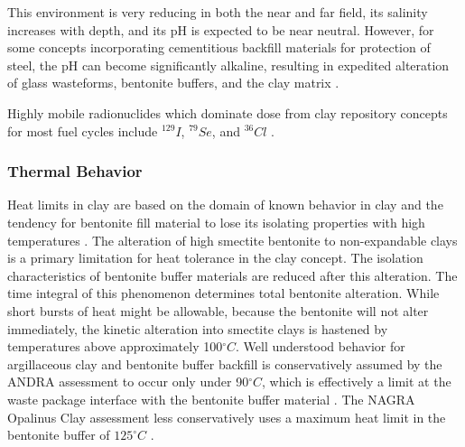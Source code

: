 This environment is very reducing in both the near and far field, its salinity 
increases with depth, and its pH is expected to be near neutral. However, for 
some concepts incorporating cementitious backfill materials for protection 
of steel, the pH can become significantly alkaline, resulting in 
expedited alteration of glass wasteforms, bentonite buffers, and the clay 
matrix \cite{andra_argile:_2005}.


Highly mobile radionuclides which dominate dose from clay repository concepts 
for most fuel cycles include $^{129}I$, $^{79}Se$, and $^{36}Cl$ 
\cite{swift_applying_2010}. 

\subsubsection{Thermal Behavior}
\label{subsec:claythermal}


Heat limits in clay are based on the domain of known behavior in clay and the 
tendency for bentonite fill material to lose its isolating properties with high 
temperatures \cite{andra_argile:_2005, pusch_alteration_1987}. 
The alteration of high smectite bentonite to non-expandable clays is a primary 
limitation for heat tolerance in the clay concept. The isolation characteristics 
of bentonite buffer materials are reduced after this alteration. The time 
integral of this phenomenon determines total bentonite alteration. While short 
bursts of heat might be allowable, because the bentonite will not alter 
immediately, the kinetic alteration into smectite clays is hastened by 
temperatures above approximately 100$^{\circ}C$\cite{pusch_alteration_1987}. 
Well understood behavior for argillaceous clay and bentonite buffer backfill
is conservatively assumed by the \gls{ANDRA} assessment to occur only under  
90$^{\circ}C$, which is effectively a limit at the waste package interface with 
the bentonite buffer material\cite{andra_argile:_2005} .
The \gls{NAGRA} Opalinus Clay assessment less conservatively 
uses a maximum heat limit in the bentonite buffer of $125^{\circ}C$
\cite{johnson_project_2002} .


% 

